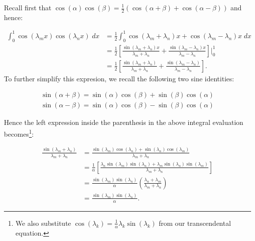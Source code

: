 \begin{solution}
    Recall first that $\cos{(\alpha) \cos{(\beta)}} = \frac{1}{2}\left( \cos(\alpha + \beta) + \cos(\alpha - \beta) \right)$
    and hence:

    \begin{align*}
        \int_{0}^{1}{\cos{(\lambda_m x)}\cos{(\lambda_n x)}\; dx} &= \frac{1}{2} \int_{0}^{1}{\cos{(\lambda_m + \lambda_n) x} + \cos{(\lambda_m - \lambda_n) x}\; dx} \\
                                                                  &= \frac{1}{2} \left[ \frac{\sin{(\lambda_m + \lambda_n)x}}{\lambda_m + \lambda_n} + \frac{\sin{(\lambda_m - \lambda_n)x}}{\lambda_m - \lambda_n} \right] \bigg\vert_{0}^{1} \\
                                                                  &= \frac{1}{2} \left[ \frac{\sin{(\lambda_m + \lambda_n)}}{\lambda_m + \lambda_n} + \frac{\sin{(\lambda_m - \lambda_n)}}{\lambda_m - \lambda_n} \right].
    \end{align*}
    To further simplify this expresion, we recall the following two sine identities:

    \begin{align*}
        \sin{(\alpha + \beta)} = \sin{(\alpha)}\cos{(\beta)} + \sin{(\beta)}\cos{(\alpha)} \\
        \sin{(\alpha - \beta)} = \sin{(\alpha)}\cos{(\beta)} - \sin{(\beta)}\cos{(\alpha)}
    \end{align*}

    Hence the left expression inside the parenthesis in the above integral evaluation becomes\footnote{
        We also substitute $\cos{(\lambda_k)} = \frac{1}{\alpha} \lambda_k \sin{(\lambda_k)}$ from our transcendental equation.
    }:

    \begin{align*}
        \frac{\sin{(\lambda_m + \lambda_n)}}{\lambda_m + \lambda_n}
        &= \frac{\sin{(\lambda_m)} \cos{(\lambda_n) + \sin{(\lambda_n)}} \cos{(\lambda_m)}}{\lambda_m + \lambda_n} \\
        &= \frac{1}{\alpha} \left[ \frac{\lambda_n \sin{(\lambda_m)} \sin{(\lambda_n) + \lambda_m} \sin{(\lambda_n)} \sin{(\lambda_m)}}{\lambda_m + \lambda_n} \right] \\
        &= \frac{\sin{(\lambda_m)} \sin{(\lambda_n)}}{\alpha} \left( \frac{\lambda_n + \lambda_m}{\lambda_m + \lambda_n} \right) \\
        &= \frac{\sin{(\lambda_m)} \sin{(\lambda_n)}}{\alpha}.
    \end{align*}
    

\end{solution}
